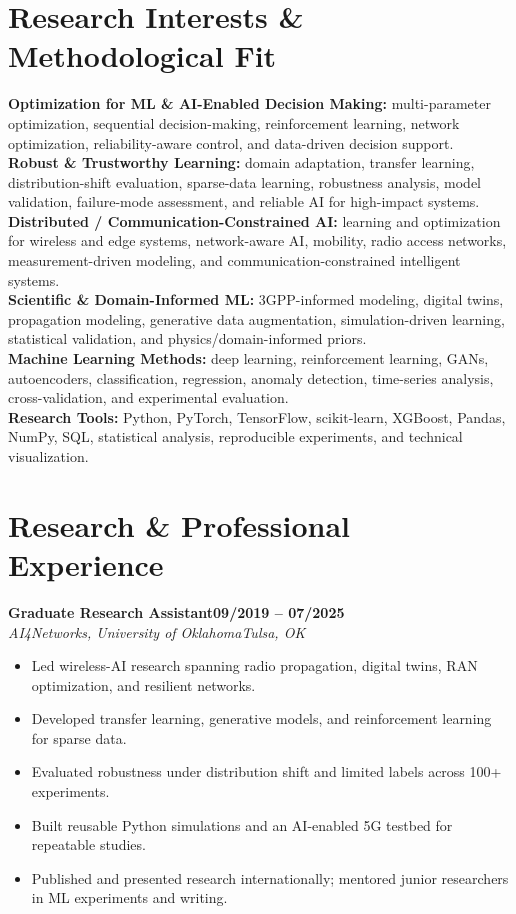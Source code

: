 \documentclass[9pt,letterpaper]{extarticle}
\newcommand{\role}[4]{\Needspace{4\baselineskip}\textbf{#1}\hfill\textbf{#2}\\[-1pt]\textit{#3}\hfill\textit{#4}\par}
\begin{document}
\section{Research Interests \& Methodological Fit}
\textbf{Optimization for ML \& AI-Enabled Decision Making:} multi-parameter optimization, sequential decision-making, reinforcement learning, network optimization, reliability-aware control, and data-driven decision support.\\
\textbf{Robust \& Trustworthy Learning:} domain adaptation, transfer learning, distribution-shift evaluation, sparse-data learning, robustness analysis, model validation, failure-mode assessment, and reliable AI for high-impact systems.\\
\textbf{Distributed / Communication-Constrained AI:} learning and optimization for wireless and edge systems, network-aware AI, mobility, radio access networks, measurement-driven modeling, and communication-constrained intelligent systems.\\
\textbf{Scientific \& Domain-Informed ML:} 3GPP-informed modeling, digital twins, propagation modeling, generative data augmentation, simulation-driven learning, statistical validation, and physics/domain-informed priors.\\
\textbf{Machine Learning Methods:} deep learning, reinforcement learning, GANs, autoencoders, classification, regression, anomaly detection, time-series analysis, cross-validation, and experimental evaluation.\\
\textbf{Research Tools:} Python, PyTorch, TensorFlow, scikit-learn, XGBoost, Pandas, NumPy, SQL, statistical analysis, reproducible experiments, and technical visualization.

\section{Research \& Professional Experience}
\role{Graduate Research Assistant}{09/2019 -- 07/2025}{AI4Networks, University of Oklahoma}{Tulsa, OK}
\begin{itemize}
\item Led wireless-AI research spanning radio propagation, digital twins, RAN optimization, and resilient networks.
\item Developed transfer learning, generative models, and reinforcement learning for sparse data.
\item Evaluated robustness under distribution shift and limited labels across 100+ experiments.
\item Built reusable Python simulations and an AI-enabled 5G testbed for repeatable studies.
\item Published and presented research internationally; mentored junior researchers in ML experiments and writing.
\end{itemize}
\end{document}
